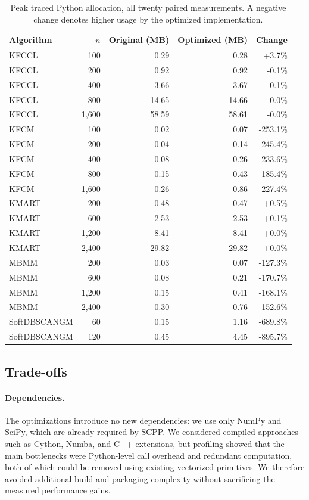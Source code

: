 \documentclass[twoside,11pt]{article}
\begin{document}
\begin{table}[h!]
\centering
\caption{Peak traced Python allocation, all twenty paired measurements. A
negative change denotes higher usage by the optimized implementation.}
\label{tab:opt-memory}
\small
\setlength{\tabcolsep}{8pt}
\renewcommand{\arraystretch}{1.1}
\begin{tabular}{lrrrr}
\toprule
Algorithm & $n$ & Original (MB) & Optimized (MB) & Change \\
\midrule
KFCCL & 100 & 0.29 & 0.28 & +3.7\% \\
KFCCL & 200 & 0.92 & 0.92 & -0.1\% \\
KFCCL & 400 & 3.66 & 3.67 & -0.1\% \\
KFCCL & 800 & 14.65 & 14.66 & -0.0\% \\
KFCCL & 1,600 & 58.59 & 58.61 & -0.0\% \\
KFCM & 100 & 0.02 & 0.07 & -253.1\% \\
KFCM & 200 & 0.04 & 0.14 & -245.4\% \\
KFCM & 400 & 0.08 & 0.26 & -233.6\% \\
KFCM & 800 & 0.15 & 0.43 & -185.4\% \\
KFCM & 1,600 & 0.26 & 0.86 & -227.4\% \\
KMART & 200 & 0.48 & 0.47 & +0.5\% \\
KMART & 600 & 2.53 & 2.53 & +0.1\% \\
KMART & 1,200 & 8.41 & 8.41 & +0.0\% \\
KMART & 2,400 & 29.82 & 29.82 & +0.0\% \\
MBMM & 200 & 0.03 & 0.07 & -127.3\% \\
MBMM & 600 & 0.08 & 0.21 & -170.7\% \\
MBMM & 1,200 & 0.15 & 0.41 & -168.1\% \\
MBMM & 2,400 & 0.30 & 0.76 & -152.6\% \\
SoftDBSCANGM & 60 & 0.15 & 1.16 & -689.8\% \\
SoftDBSCANGM & 120 & 0.45 & 4.45 & -895.7\% \\
\bottomrule
\end{tabular}
\end{table}

\subsection{Trade-offs}

\paragraph{Dependencies.}
The optimizations introduce no new dependencies: we use only NumPy and SciPy,
which are already required by SCPP. We considered compiled approaches such as
Cython, Numba, and C++ extensions, but profiling showed that the main
bottlenecks were Python-level call overhead and redundant computation, both of
which could be removed using existing vectorized primitives. We therefore
avoided additional build and packaging complexity without sacrificing the
measured performance gains.
\end{document}
